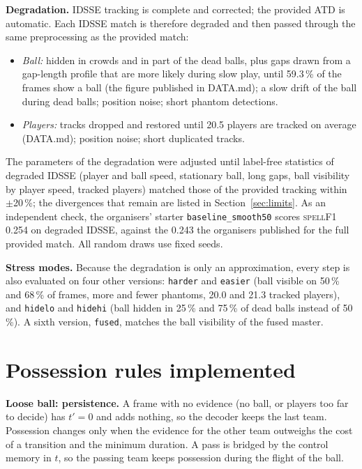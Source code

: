 \documentclass[journal]{IEEEtran}
\newcommand{\spf}{\textsc{spellF1}}
\begin{document}
\textbf{Degradation.} IDSSE tracking is complete and corrected; the provided ATD is automatic. Each IDSSE match is therefore degraded and then passed through the same preprocessing as the provided match:
\begin{itemize}
\item \emph{Ball:} hidden in crowds and in part of the dead balls, plus gaps drawn from a gap-length profile that are more likely during slow play, until 59.3\,\% of the frames show a ball (the figure published in DATA.md); a slow drift of the ball during dead balls; position noise; short phantom detections.
\item \emph{Players:} tracks dropped and restored until 20.5 players are tracked on average (DATA.md); position noise; short duplicated tracks.
\end{itemize}
The parameters of the degradation were adjusted until label-free statistics of degraded IDSSE (player and ball speed, stationary ball, long gaps, ball visibility by player speed, tracked players) matched those of the provided tracking within $\pm$20\,\%; the divergences that remain are listed in Section~\ref{sec:limits}. As an independent check, the organisers' starter \texttt{baseline\_smooth50} scores \spf{} 0.254 on degraded IDSSE, against the 0.243 the organisers published for the full provided match. All random draws use fixed seeds.

\textbf{Stress modes.} Because the degradation is only an approximation, every step is also evaluated on four other versions: \texttt{harder} and \texttt{easier} (ball visible on 50\,\% and 68\,\% of frames, more and fewer phantoms, 20.0 and 21.3 tracked players), and \texttt{hidelo} and \texttt{hidehi} (ball hidden in 25\,\% and 75\,\% of dead balls instead of 50\,\%). A sixth version, \texttt{fused}, matches the ball visibility of the fused master.

\section{Possession rules implemented}
\label{sec:rules}

\textbf{Loose ball: persistence.} A frame with no evidence (no ball, or players too far to decide) has $t'=0$ and adds nothing, so the decoder keeps the last team. Possession changes only when the evidence for the other team outweighs the cost of a transition and the minimum duration. A pass is bridged by the control memory in $t$, so the passing team keeps possession during the flight of the ball.
\end{document}
